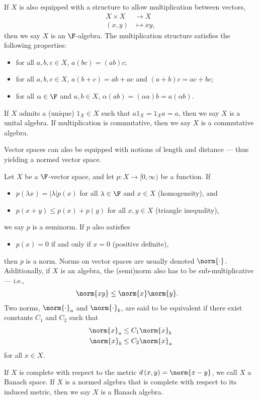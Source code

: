 \begin{definition}
  If $X$ is also equipped with a structure to allow multiplication between vectors,
  \begin{align*}
    X\times X &\rightarrow X\\
    \left(x,y\right) &\mapsto xy,
  \end{align*}
  then we say $X$ is an $\F$-algebra. The multiplication structure satisfies the following properties:
  \begin{itemize}
    \item for all $a,b,c\in X$, $a\left(bc\right) = \left(ab\right)c$;
    \item for all $a,b,c\in X$, $a\left(b+c\right) = ab + ac$ and $\left(a+b\right)c = ac + bc$;
    \item for all $\alpha\in \F$ and $a,b\in X$, $\alpha \left(ab\right) = \left(\alpha a\right)b = a\left(\alpha b\right)$.
  \end{itemize}
  If $X$ admits a (unique) $1_X\in X$ such that $a1_X = 1_X a = a$, then we say $X$ is a unital algebra. If multiplication is commutative, then we say $X$ is a commutative algebra.
\end{definition}
Vector spaces can also be equipped with notions of length and distance --- thus yielding a normed vector space.
\begin{definition}\label{def:norms}
  Let $X$ be a $\F$-vector space, and let $p\colon X\rightarrow [0,\infty)$ be a function. If
  \begin{itemize}
    \item $p\left(\lambda x\right) = \left\vert \lambda \right\vert p(x)$ for all $\lambda\in \F$ and $x\in X$ (homogeneity), and
    \item $p\left(x + y\right)\leq p\left(x\right) + p\left(y\right)$ for all $x,y\in X$ (triangle inequality),
  \end{itemize}
  we say $p$ is a seminorm. If $p$ also satisfies
  \begin{itemize}
    \item $p\left(x\right) = 0 $ if and only if $x = 0$ (positive definite),
  \end{itemize}
  then $p$ is a norm. Norms on vector spaces are usually denoted $\norm{\cdot}$. Additionally, if $X$ is an algebra, the (semi)norm also has to be sub-multiplicative --- i.e.,
  \begin{align*}
    \norm{xy} &\leq \norm{x}\norm{y}.
  \end{align*}
  Two norms, $\norm{\cdot}_a$ and $\norm{\cdot}_b$, are said to be equivalent if there exist constants $C_1$ and $C_2$ such that
  \begin{align*}
    \norm{x}_a &\leq C_1\norm{x}_b\\
    \norm{x}_b &\leq C_2 \norm{x}_a
  \end{align*}
  for all $x\in X$.\newline

  If $X$ is complete with respect to the metric $d\left(x,y\right) = \norm{x-y}$, we call $X$ a Banach space. If $X$ is a normed algebra that is complete with respect to its induced metric, then we say $X$ is a Banach algebra.
\end{definition}
